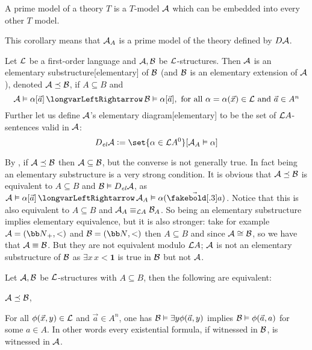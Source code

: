 \bdefn

    A {\emphcolor prime model} of a theory $T$ is a $T$-model ${\cal A}$ which can be embedded into every other $T$ model.

\edefn

This corollary means that ${\cal A}_A$ is a prime model of the theory defined by $D{\cal A}$.

\bdefn

    Let ${\cal L}$ be a first-order language and ${\cal A},{\cal B}$ be ${\cal L}$-structures.
    Then ${\cal A}$ is an {\emphcolor elementary substructure}[elementary] of ${\cal B}$ (and ${\cal B}$ is an {\emphcolor elementary extension} of ${\cal A}$),
    denoted ${\cal A}\preceq{\cal B}$, if $A\subseteq B$ and
    $$ {\cal A}\vDash\alpha[\vec a]\iff {\cal B}\vDash\alpha[\vec a],\hbox{ for all $\alpha=\alpha(\vec x)\in{\cal L}$ and $\vec a\in A^n$} $$
    Further let us define ${\cal A}$'s {\emphcolor elementary diagram}[elementary] to be the set of ${\cal L}A$-sentences valid in ${\cal A}$:
    $$ D_{\it el}{\cal A}\coloneqq\set{\alpha\in{\cal L}A^0}[{\cal A}_A\vDash\alpha] $$

\edefn

By , if ${\cal A}\preceq{\cal B}$ then ${\cal A}\subseteq{\cal B}$, but the converse is not generally true.
In fact being an elementary substructure is a very strong condition.
It is obvious that ${\cal A}\preceq{\cal B}$ is equivalent to $A\subseteq B$ and ${\cal B}\vDash D_{\it el}{\cal A}$, as ${\cal A}\vDash\alpha[\vec a]\iff {\cal A}_A\vDash\alpha(\vec{\boldsymbol a})$.
Notice that this is also equivalent to $A\subseteq B$ and ${\cal A}_A\equiv_{{\cal L}A}{\cal B}_A$.
So being an elementary substructure implies elementary equivalence, but it is also stronger: take for example ${\cal A}=({\bb N}_+,<)$ and ${\cal B}=({\bb N},<)$ then $A\subseteq B$ and since
${\cal A}\cong{\cal B}$, so we have that ${\cal A}\equiv{\cal B}$.
But they are not equivalent modulo ${\cal L}A$; ${\cal A}$ is not an elementary substructure of ${\cal B}$ as $\exists x\,x<\boldsymbol1$ is true in ${\cal B}$ but not ${\cal A}$.

\bthrm[title=Tarski's Criterion, name=tarskicriterion]

    Let ${\cal A},{\cal B}$ be ${\cal L}$-structures with $A\subseteq B$, then the following are equivalent:
    \benum
        \item ${\cal A}\preceq{\cal B}$,
        \item For all $\phi(\vec x,y)\in{\cal L}$ and $\vec a\in A^n$, one has ${\cal B}\vDash\exists y\phi(\vec a,y)$ implies ${\cal B}\vDash\phi(\vec a,a)$ for some $a\in A$.
        In other words every existential formula, if witnessed in ${\cal B}$, is witnessed in ${\cal A}$.
    \eenum

